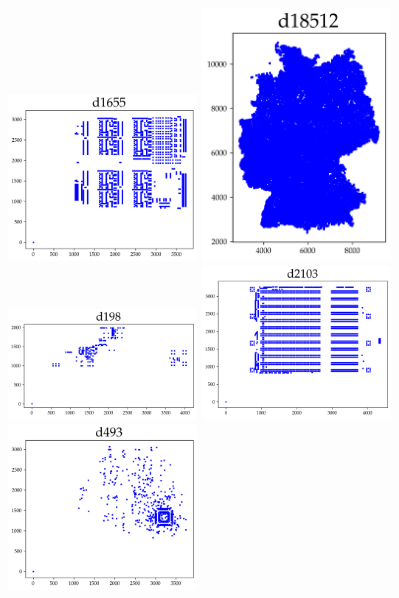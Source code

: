 \begin{appendices}
\begin{figure}[H]
\includegraphics[width=5cm]{../tsplib_euc2d_pictures_of_instances/d1655.png}
\includegraphics[width=5cm]{../tsplib_euc2d_pictures_of_instances/d18512.png}
\includegraphics[width=5cm]{../tsplib_euc2d_pictures_of_instances/d198.png}
\includegraphics[width=5cm]{../tsplib_euc2d_pictures_of_instances/d2103.png}
\includegraphics[width=5cm]{../tsplib_euc2d_pictures_of_instances/d493.png}

\end{figure}
\end{appendices}
